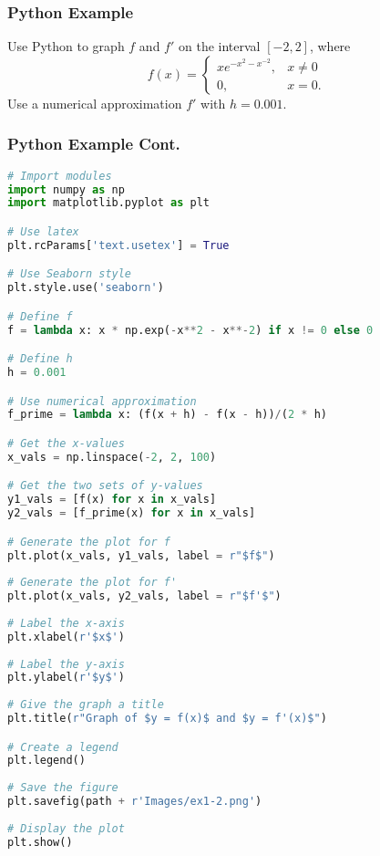 \documentclass{beamer}
\begin{document}
\begin{frame}
\frametitle{Python Example}
\begin{Example}
Use Python to graph $f$ and $f'$ on the interval $[-2, 2]$, where
$$
f(x) = \begin{cases} x e^{-x^2 - x^{-2}}, & x \neq 0\\ 0,	& x= 0.\end{cases}
$$
Use a numerical approximation $f'$ with $h = 0.001$.
\end{Example}
\end{frame}

\begin{frame}[fragile]
\frametitle{Python Example Cont.}

\begin{multicols}{2}
\begin{lstlisting}[language=Python]
# Import modules 
import numpy as np
import matplotlib.pyplot as plt

# Use latex
plt.rcParams['text.usetex'] = True

# Use Seaborn style
plt.style.use('seaborn')

# Define f
f = lambda x: x * np.exp(-x**2 - x**-2) if x != 0 else 0

# Define h
h = 0.001

# Use numerical approximation
f_prime = lambda x: (f(x + h) - f(x - h))/(2 * h)

# Get the x-values
x_vals = np.linspace(-2, 2, 100)

# Get the two sets of y-values
y1_vals = [f(x) for x in x_vals]
y2_vals = [f_prime(x) for x in x_vals]

# Generate the plot for f
plt.plot(x_vals, y1_vals, label = r"$f$")
         
# Generate the plot for f'
plt.plot(x_vals, y2_vals, label = r"$f'$")  
         
# Label the x-axis
plt.xlabel(r'$x$')
         
# Label the y-axis
plt.ylabel(r'$y$')
         
# Give the graph a title
plt.title(r"Graph of $y = f(x)$ and $y = f'(x)$")

# Create a legend
plt.legend()
         
# Save the figure
plt.savefig(path + r'Images/ex1-2.png')
         
# Display the plot
plt.show()    
\end{lstlisting}
\end{multicols}
\end{frame}
\end{document}
